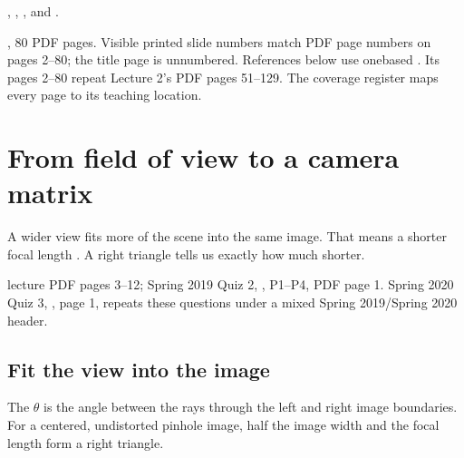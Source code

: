 \documentclass[letterpaper,11pt,english,openany,oneside]{jupyterBook}
\begin{document}
\sphinxAtStartPar
{} {\hyperref[\detokenize{lectures/lecture01/cameras::doc}]{}}, {\hyperref[\detokenize{lectures/lecture02/homographies::doc}]{}}, {\hyperref[\detokenize{lectures/lecture02/warping::doc}]{}}, and {\hyperref[\detokenize{lectures/lecture02/estimation::doc}]{}}.

\sphinxAtStartPar
{} , 80 PDF pages. Visible printed slide numbers match PDF page numbers on pages 2–80; the title page is unnumbered. References below use one\sphinxhyphen{}based . Its pages 2–80 repeat Lecture 2’s PDF pages 51–129. The coverage register maps every page to its teaching location.

\sphinxstepscope


\section{From field of view to a camera matrix}
\label{\detokenize{lectures/lecture03/calibration:from-field-of-view-to-a-camera-matrix}}\label{\detokenize{lectures/lecture03/calibration:lec03-calibration}}\label{\detokenize{lectures/lecture03/calibration::doc}}
\sphinxAtStartPar
A wider view fits more of the scene into the same image. That means a shorter focal length . A right triangle tells us exactly how much shorter.

\sphinxAtStartPar
{} lecture PDF pages 3–12; Spring 2019 Quiz 2, , P1–P4, PDF page 1. Spring 2020 Quiz 3, , page 1, repeats these questions under a mixed Spring 2019/Spring 2020 header.

\ignorespaces

\subsection{Fit the view into the image}
\label{\detokenize{lectures/lecture03/calibration:fit-the-view-into-the-image}}\label{\detokenize{lectures/lecture03/calibration:index-0}}
\sphinxAtStartPar
The  \(\theta\) is the angle between the rays through the left and right image boundaries. For a centered, undistorted pinhole image, half the image width and the focal length form a right triangle.
\end{document}
